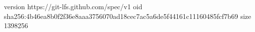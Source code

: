 version https://git-lfs.github.com/spec/v1
oid sha256:4b46ea8b0f2f36e8aaa3756070ad18cec7ac5a6de5f44161c11160485fcf7b69
size 1398256
